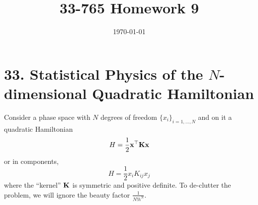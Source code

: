 \documentclass[a4paper,twoside]{article}
\title{33-765 Homework 9}
\date{\today}
\begin{document}
\maketitle

\section*{33. Statistical Physics of the $ N $-dimensional Quadratic Hamiltonian}
Consider a phase space with $ N $ degrees of freedom $ \{x_i\}_{i = 1,\ldots,N} $ and on it a quadratic Hamiltonian
\begin{equation}
    H = \frac{1}{2} \vb{x}^\top \vb{K} \vb{x}
\end{equation}
or in components,
\begin{equation}
    H = \frac{1}{2} x_i K_{ij} x_j
\end{equation}
where the ``kernel'' $ \vb{K} $ is symmetric and positive definite. To de-clutter the problem, we will ignore the beauty factor $ \frac{1}{N!h^N} $.
\end{document}
